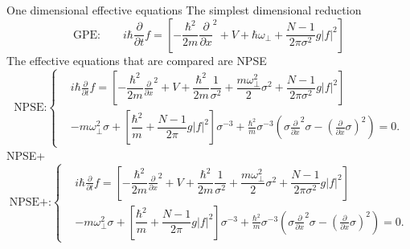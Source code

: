 \documentclass[final]{beamer}
\newlength{\colwidth}
\begin{document}
\begin{frame}[t]
\begin{columns}[t]
\begin{column}{\colwidth}
\begin{block}{One dimensional effective equations}
        The simplest dimensional reduction
        \begin{equation}
          \text{GPE:} \qquad i\hbar \frac{\partial}{\partial t} f = \left[-\dfrac{\hbar^2}{2m} \frac{\partial}{\partial x}^2  + V + \hbar\omega_\perp+ \dfrac{N-1}{2\pi \sigma^2} g|f|^2 \right]
        \end{equation}
        The effective equations that are compared are \large{NPSE}
        \begin{equation}
          \text{NPSE:}\left\{\begin{split}
              &i\hbar \frac{\partial}{\partial t} f = \left[-\dfrac{\hbar^2}{2m} \frac{\partial}{\partial x}^2  + V +\dfrac{\hbar^2}{2m}\dfrac{1}{\sigma^{2}}  + \dfrac{m\omega_\perp^2}{2}\sigma^2 + \dfrac{N-1}{2\pi \sigma^2} g|f|^2 \right] \\
          &- m\omega_\perp^2\sigma + \left[\dfrac{\hbar^2}{m} + \dfrac{N-1}{2\pi} g|f|^2\right]\sigma^{-3} +\frac{\hbar^2}{m} \sigma^{-3}\left(\sigma\frac{\partial}{\partial x}^2 \sigma - \left(\frac{\partial}{\partial x} \sigma \right)^2 \right)= 0.
        \end{split} \right.
        \end{equation} 
        \large{NPSE+}
     \begin{equation}
          \text{NPSE+:}\left\{\begin{split}
              &i\hbar \frac{\partial}{\partial t} f = \left[-\dfrac{\hbar^2}{2m} \frac{\partial}{\partial x}^2  + V +\dfrac{\hbar^2}{2m}\dfrac{1}{\sigma^{2}}  + \dfrac{m\omega_\perp^2}{2}\sigma^2 + \dfrac{N-1}{2\pi \sigma^2} g|f|^2 \right] \\
          &- m\omega_\perp^2\sigma + \left[\dfrac{\hbar^2}{m} + \dfrac{N-1}{2\pi} g|f|^2\right]\sigma^{-3} +\frac{\hbar^2}{m} \sigma^{-3}\left(\sigma\frac{\partial}{\partial x}^2 \sigma - \left(\frac{\partial}{\partial x} \sigma \right)^2 \right)= 0.
        \end{split} \right.
        \end{equation}


\end{block}
\end{column}
\end{columns}
\end{frame}
\end{document}

